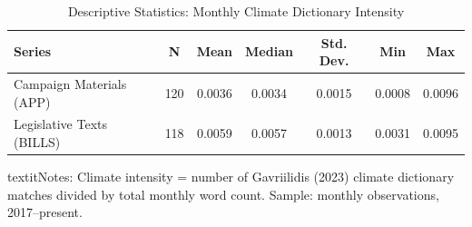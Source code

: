 \begin{table}[!h]
\centering
\caption{\label{tab:climate_intensity_summary}Descriptive Statistics: Monthly Climate Dictionary Intensity}
\centering
\begin{threeparttable}
\begin{tabular}[t]{lcccccc}
\toprule
Series & N & Mean & Median & Std. Dev. & Min & Max\\
\midrule
Campaign Materials (APP) & 120 & 0.0036 & 0.0034 & 0.0015 & 0.0008 & 0.0096\\
Legislative Texts (BILLS) & 118 & 0.0059 & 0.0057 & 0.0013 & 0.0031 & 0.0095\\
\bottomrule
\end{tabular}
\begin{tablenotes}
\item textit{Notes:} Climate intensity = number of Gavriilidis (2023) climate dictionary matches divided by total monthly word count. Sample: monthly observations, 2017--present.
\end{tablenotes}
\end{threeparttable}
\end{table}

